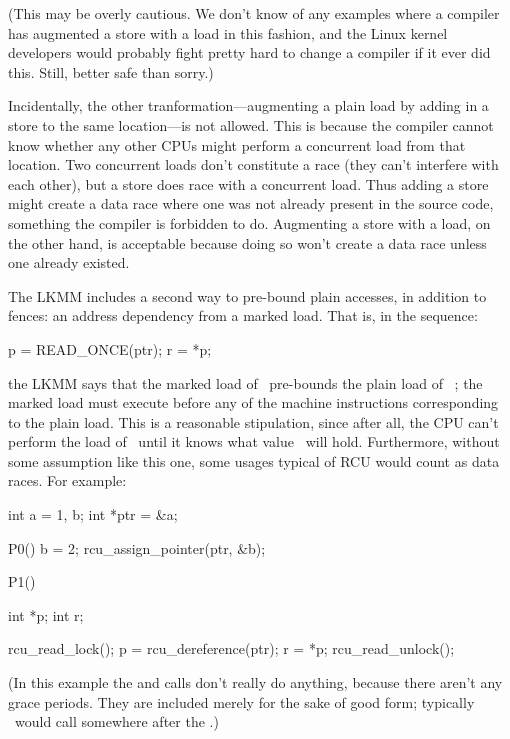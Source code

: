 (This may be overly cautious.
We don't know of any examples where a
compiler has augmented a store with a load in this fashion, and the
Linux kernel developers would probably fight pretty hard to change a
compiler if it ever did this.
Still, better safe than sorry.)

Incidentally, the other tranformation---augmenting a plain load by
adding in a store to the same location---is not allowed.
This is
because the compiler cannot know whether any other CPUs might perform
a concurrent load from that location.
Two concurrent loads don't
constitute a race (they can't interfere with each other), but a store
does race with a concurrent load.
Thus adding a store might create a
data race where one was not already present in the source code,
something the compiler is forbidden to do.
Augmenting a store with a
load, on the other hand, is acceptable because doing so won't create a
data race unless one already existed.

The LKMM includes a second way to pre-bound plain accesses, in
addition to fences{:} an address dependency from a marked load.
That
is, in the sequence:

\begin{VerbatimU}
	p = READ_ONCE(ptr);
	r = *p;
\end{VerbatimU}

\noindent%
the LKMM says that the marked load of~ pre-bounds the plain load of~%
; the marked load must execute before any of the machine
instructions corresponding to the plain load.
This is a reasonable
stipulation, since after all, the CPU can't perform the load of~
until it knows what value ~will hold.
Furthermore, without some
assumption like this one, some usages typical of RCU would count as
data races.
For example:

\begin{VerbatimU}
	int a = 1, b;
	int *ptr = &a;

	P0()
	{
		b = 2;
		rcu_assign_pointer(ptr, &b);
	}

	P1()
	{
		int *p;
		int r;

		rcu_read_lock();
		p = rcu_dereference(ptr);
		r = *p;
		rcu_read_unlock();
	}
\end{VerbatimU}

(In this example the  and  calls don't
really do anything, because there aren't any grace periods.
They are
included merely for the sake of good form; typically ~would call
 somewhere after the .)


